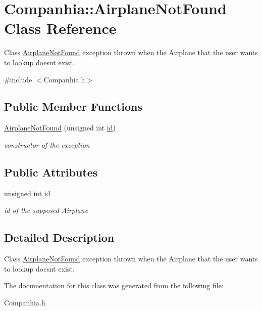 \hypertarget{class_companhia_1_1_airplane_not_found}{}\section{Companhia\+:\+:Airplane\+Not\+Found Class Reference}
\label{class_companhia_1_1_airplane_not_found}


Class \hyperlink{class_companhia_1_1_airplane_not_found}{Airplane\+Not\+Found} exception thrown when the Airplane that the user wants to lookup doesn\textquotesingle{}t exist.  




{\ttfamily \#include $<$Companhia.\+h$>$}

\subsection*{Public Member Functions}
\begin{DoxyCompactItemize}
\item 
\mbox{\label{class_companhia_1_1_airplane_not_found_a698b85e7fe721b98a6844f565b4d3e39}} 
\hyperlink{class_companhia_1_1_airplane_not_found_a698b85e7fe721b98a6844f565b4d3e39}{Airplane\+Not\+Found} (unsigned int \hyperlink{class_companhia_1_1_airplane_not_found_a27cdb59560b733ded49c4ba95be8ef7e}{id})
\begin{DoxyCompactList}\small\item\em constructor of the exception \end{DoxyCompactList}\end{DoxyCompactItemize}
\subsection*{Public Attributes}
\begin{DoxyCompactItemize}
\item 
\mbox{\label{class_companhia_1_1_airplane_not_found_a27cdb59560b733ded49c4ba95be8ef7e}} 
unsigned int \hyperlink{class_companhia_1_1_airplane_not_found_a27cdb59560b733ded49c4ba95be8ef7e}{id}
\begin{DoxyCompactList}\small\item\em id of the supposed Airplane \end{DoxyCompactList}\end{DoxyCompactItemize}


\subsection{Detailed Description}
Class \hyperlink{class_companhia_1_1_airplane_not_found}{Airplane\+Not\+Found} exception thrown when the Airplane that the user wants to lookup doesn\textquotesingle{}t exist. 

The documentation for this class was generated from the following file\+:\begin{DoxyCompactItemize}
\item 
Companhia.\+h\end{DoxyCompactItemize}
